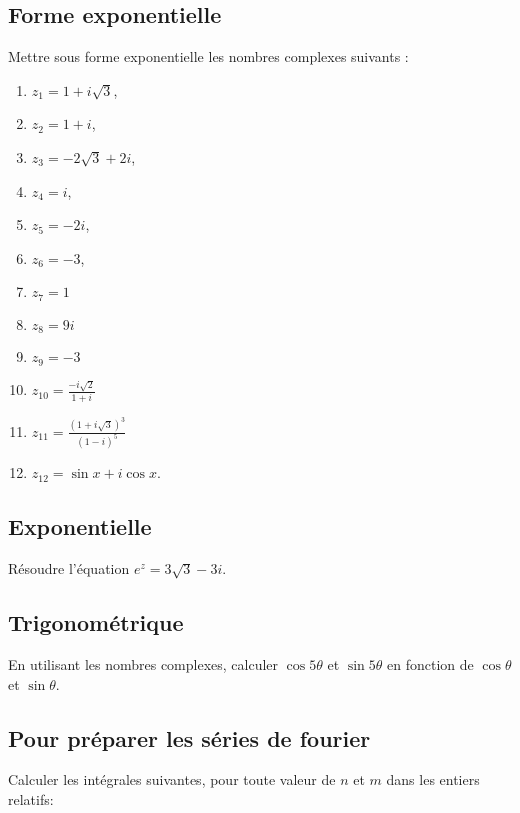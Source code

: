 \vspace{2em}

\subsection{Forme exponentielle}
Mettre sous forme exponentielle les nombres complexes suivants : 
\begin{multicols}{3}
\begin{enumerate}
    \item $z_1=1+i \sqrt{3}$, 
    \item $z_2=1+i$, 
    \item $z_3=-2 \sqrt{3}+2 i$, 
    \item $z_4=i$, 
    \item $z_5=-2 i$, 
    \item $z_6=-3$,
    \item $z_7=1$
    \item $z_8=9 i$
    \item $z_9=-3$
    \item $z_{10}=\frac{-i \sqrt{2}}{1+i}$
    \item $z_{11}=\frac{(1+i \sqrt{3})^3}{(1-i)^5}$
    \item $z_{12}=\sin x+i \cos x$.
\end{enumerate}
\end{multicols}



\vspace{2em}

\subsection{Exponentielle}
Résoudre l'équation $e^z=3 \sqrt{3}-3 i$.

\newpage

\subsection{Trigonométrique}
En utilisant les nombres complexes, calculer  $\cos 5 \theta$ et $\sin 5 \theta$ en fonction de $\cos \theta$ et $\sin \theta$.

\vspace{2em}


\subsection{Pour préparer les séries de fourier}
Calculer les intégrales suivantes, pour toute valeur de $n$ et $m$ dans les entiers relatifs:


